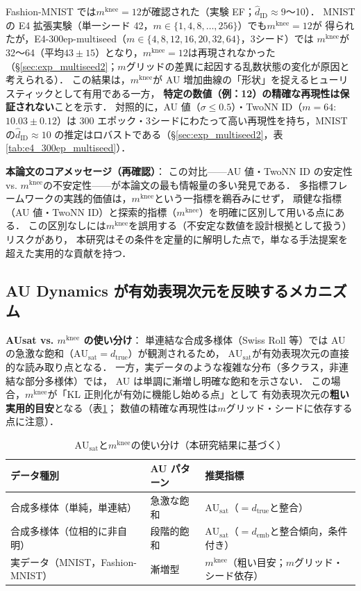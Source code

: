 \documentclass[11pt,a4paper]{jsarticle}
\newcommand{\dtrue}{d_{\mathrm{true}}}
\newcommand{\AUsat}{\mathrm{AU}_{\mathrm{sat}}}
\newcommand{\mknee}{m^{\mathrm{knee}}}
\newcommand{\demb}{d_{\mathrm{emb}}}
\begin{document}
Fashion-MNIST では$\mknee = 12$が確認された（実験 EF；$\hat{d}_\mathrm{ID} \approx 9$〜10）．
MNIST の E4 拡張実験（単一シード 42，$m \in \{1, 4, 8, \ldots, 256\}$）でも$\mknee = 12$が
得られたが，E4-300ep-multiseed（$m \in \{4, 8, 12, 16, 20, 32, 64\}$，3シード）では
$\mknee$が 32〜64（平均$43 \pm 15$）となり，$\mknee = 12$は再現されなかった
（§\ref{sec:exp_multiseed2}；$m$グリッドの差異に起因する乱数状態の変化が原因と考えられる）．
この結果は，$\mknee$が AU 増加曲線の「形状」を捉えるヒューリスティックとして有用である一方，
\textbf{特定の数値（例：12）の精確な再現性は保証されない}ことを示す．
対照的に，AU 値（$\sigma \leq 0.5$）・TwoNN ID（$m=64$: $10.03 \pm 0.12$）は
300 エポック・3シードにわたって高い再現性を持ち，MNIST の$\hat{d}_\mathrm{ID} \approx 10$
の推定はロバストである（§\ref{sec:exp_multiseed2}，表\ref{tab:e4_300ep_multiseed}）．

\textbf{本論文のコアメッセージ（再確認）}：
この対比——AU 値・TwoNN ID の安定性 vs. $\mknee$の不安定性——が本論文の最も情報量の多い発見である．
多指標フレームワークの実践的価値は，$\mknee$という一指標を鵜呑みにせず，
頑健な指標（AU 値・TwoNN ID）と探索的指標（$\mknee$）を明確に区別して用いる点にある．
この区別なしには$\mknee$を誤用する（不安定な数値を設計根拠として扱う）リスクがあり，
本研究はその条件を定量的に解明した点で，単なる手法提案を超えた実用的な貢献を持つ．

\subsection{AU Dynamics が有効表現次元を反映するメカニズム}\label{sec:disc_au_dynamics}

\textbf{AUsat vs. $\mknee$ の使い分け}：
単連結な合成多様体（Swiss Roll 等）では AU の急激な飽和（$\AUsat = \dtrue$）が観測されるため，
$\AUsat$が有効表現次元の直接的な読み取り点となる．
一方，実データのような複雑な分布（多クラス，非連結な部分多様体）では，
AU は単調に漸増し明確な飽和を示さない．
この場合，$\mknee$が「KL 正則化が有効に機能し始める点」として
有効表現次元の\textbf{粗い実用的目安}となる（表\ref{tab:au_comparison}；
数値の精確な再現性は$m$グリッド・シードに依存する点に注意）．

\begin{table}[H]
\centering
\caption{$\AUsat$と$\mknee$の使い分け（本研究結果に基づく）}
\label{tab:au_comparison}
\small
\begin{tabular}{lll}
\toprule
データ種別 & AU パターン & 推奨指標 \\
\midrule
合成多様体（単純，単連結） & 急激な飽和 & $\AUsat$（$= \dtrue$と整合） \\
合成多様体（位相的に非自明） & 段階的飽和 & $\AUsat$（$= \demb$と整合傾向，条件付き） \\
実データ（MNIST，Fashion-MNIST） & 漸増型 & $\mknee$（粗い目安；$m$グリッド・シード依存） \\
\bottomrule
\end{tabular}
\end{table}
\end{document}
